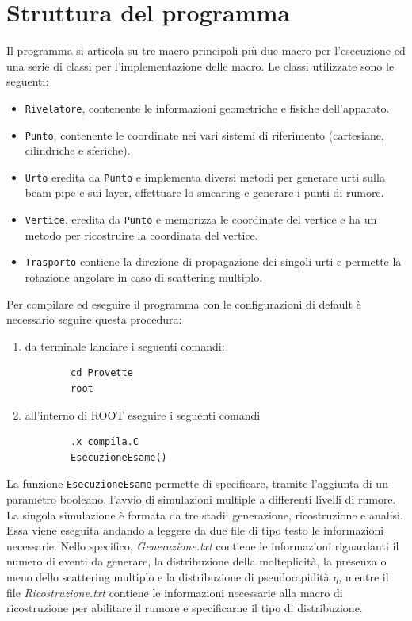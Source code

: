 \documentclass[11pt,a4paper]{article}
\begin{document}
\section{Struttura del programma}
\par Il programma si articola su tre macro principali più due macro per l'esecuzione ed una serie di classi per l'implementazione delle macro. Le classi utilizzate sono le seguenti:
\begin{itemize}
\item \lstinline{Rivelatore}, contenente le informazioni geometriche e fisiche dell'apparato.
\item \lstinline{Punto}, contenente le coordinate nei vari sistemi di riferimento (cartesiane, cilindriche e sferiche).
\item \lstinline{Urto} eredita da \lstinline{Punto} e implementa diversi metodi per generare urti sulla beam pipe e sui layer, effettuare lo smearing e generare i punti di rumore.
\item \lstinline{Vertice}, eredita da \lstinline{Punto} e memorizza le coordinate del vertice e ha un metodo per ricostruire la coordinata del vertice.
\item \lstinline{Trasporto} contiene la direzione di propagazione dei singoli urti e permette la rotazione angolare in caso di scattering multiplo.
\end{itemize}
Per compilare ed eseguire il programma con le configurazioni di default è necessario seguire questa procedura:
\begin{enumerate}
    \item da terminale lanciare i seguenti comandi:
    \begin{lstlisting}
        cd Provette
        root
    \end{lstlisting}
    \item all'interno di ROOT eseguire i seguenti comandi
    \begin{lstlisting}
        .x compila.C
        EsecuzioneEsame()
    \end{lstlisting}
\end{enumerate}
La funzione \lstinline{EsecuzioneEsame} permette di specificare, tramite l'aggiunta di un parametro booleano, l'avvio di simulazioni multiple a differenti livelli di rumore. La singola simulazione è formata da tre stadi: generazione, ricostruzione e analisi.\\
Essa viene eseguita andando a leggere da due file di tipo testo le informazioni necessarie. Nello specifico, \textit{Generazione.txt} contiene le informazioni riguardanti il numero di eventi da generare, la distribuzione della molteplicità, la presenza o meno dello scattering multiplo e la distribuzione di pseudorapidità $\eta$, mentre il file \textit{Ricostruzione.txt} contiene le informazioni necessarie alla macro di ricostruzione per abilitare il rumore e specificarne il tipo di distribuzione.\\
\end{document}

